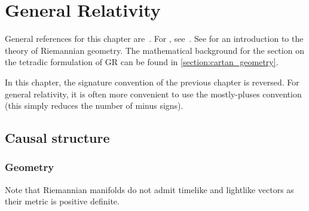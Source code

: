 \chapter{General Relativity}\label{chapter:GR}

    General references for this chapter are~\citet{rovelli_covariant_2014,misner_gravitation_2017,blau_lecture_2026}. For , see~\citet{tavakoli_lecture_2014}. See  for an introduction to the theory of Riemannian geometry. The mathematical background for the section on the tetradic formulation of GR can be found in \cref{section:cartan_geometry}.

    In this chapter, the signature convention of the previous chapter is reversed. For general relativity, it is often more convenient to use the mostly-pluses convention (this simply reduces the number of minus signs).

    \minitoc

\section{Causal structure}
\subsection{Geometry}

    \begin{remark}
        Note that Riemannian manifolds do not admit timelike and lightlike vectors as their metric is positive definite.
    \end{remark}

